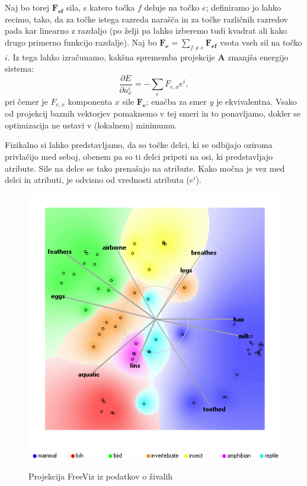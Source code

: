Naj bo torej $\mathbf{F_{ef}}$ sila, s katero točka $f$ deluje na točko $e$; definiramo jo lahko recimo, tako, da za točke istega razreda narašča in za točke različnih razredov pada kar linearno z razdaljo (po želji pa lahko izberemo tudi kvadrat ali kako drugo primerno funkcijo razdalje). Naj bo $\mathbf{F_e} = \sum_{f\ne e} \mathbf{F_{ef}}$ vsota vseh sil na točko $i$. Iz tega lahko izračunamo, kakšna sprememba projekcije $\mathbf{A}$ zmanjša energijo sistema:
$$\frac{\partial E}{\partial a^i_x} = -\sum_e F_{e, x}e^i,$$ pri čemer je $F_{e, x}$ komponenta $x$ sile $\mathbf{F_e}$; enačba za smer $y$ je ekvivalentna. Vsako od projekcij baznih vektorjev pomaknemo v tej smeri in to ponavljamo, dokler se optimizacija ne ustavi v (lokalnem) minimumu.

Fizikalno si lahko predstavljamo, da so točke delci, ki se odbijajo oziroma privlačijo med seboj, obenem pa so ti delci pripeti na osi, ki predstavljajo atribute. Sile na delce se tako prenašajo na atribute. Kako močna je vez med delci in atributi, je odvisno od vrednosti atributa ($e^i$). 

\begin{figure}[tbp]
\begin{center}
\includegraphics[width=12cm]{slike/zoo-freeviz.png}
\includegraphics[width=12cm]{slike/zoo-legenda.png}
\caption{Projekcija FreeViz iz podatkov o živalih}
\label{f-zoo-freeviz}
\end{center}
\end{figure}


